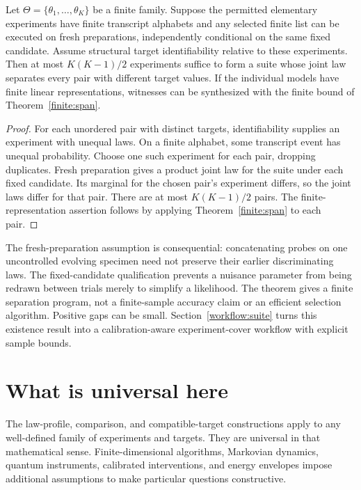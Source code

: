 \begin{theorem}
\label{foundations:suite}
Let $\Theta=\{\theta_1,\ldots,\theta_K\}$ be a finite family. Suppose
the permitted elementary experiments have finite transcript alphabets and
any selected finite list can be executed on fresh preparations, independently
conditional on the same fixed candidate. Assume structural target
identifiability relative to these experiments. Then at most
$K(K-1)/2$ experiments suffice to form a suite whose joint law separates
every pair with different target values. If the individual models have
finite linear representations, witnesses can be synthesized with the finite
bound of Theorem~\ref{finite:span}.
\end{theorem}
\begin{proof}
For each unordered pair with distinct targets, identifiability supplies an
experiment with unequal laws. On a finite alphabet, some transcript event
has unequal probability. Choose one such experiment for each pair, dropping
duplicates. Fresh preparation gives a product joint law for the suite under
each fixed candidate. Its marginal for the chosen pair's experiment differs,
so the joint laws differ for that pair. There are at most $K(K-1)/2$ pairs.
The finite-representation assertion follows by applying
Theorem~\ref{finite:span} to each pair.
\end{proof}

The fresh-preparation assumption is consequential: concatenating probes on
one uncontrolled evolving specimen need not preserve their earlier
discriminating laws. The fixed-candidate qualification prevents a nuisance
parameter from being redrawn between trials merely to simplify a likelihood.
The theorem gives a finite separation program, not a finite-sample accuracy
claim or an efficient selection algorithm. Positive gaps can be small.
Section~\ref{workflow:suite} turns this existence result into a
calibration-aware experiment-cover workflow with explicit sample bounds.

\section{What is universal here}

The law-profile, comparison, and compatible-target constructions apply to
any well-defined family of experiments and targets. They are universal in
that mathematical sense. Finite-dimensional algorithms, Markovian dynamics,
quantum instruments, calibrated interventions, and energy envelopes impose
additional assumptions to make particular questions constructive.

